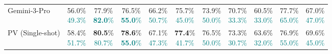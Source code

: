 \begin{table}[t]
{\begin{tabular}{@{}lcccccccccc@{}}
    \midrule
    Gemini-3-Pro & \shortstack{56.0\% \\ \textcolor{teal}{\scriptsize 49.3\%}} & \shortstack{77.9\% \\ \textcolor{teal}{\scriptsize \textbf{82.0}\%}} & \shortstack{76.5\% \\ \textcolor{teal}{\scriptsize \textbf{55.0}\%}} & \shortstack{66.2\% \\ \textcolor{teal}{\scriptsize 50.7\%}} & \shortstack{75.7\% \\ \textcolor{teal}{\scriptsize 45.0\%}} & \shortstack{73.9\% \\ \textcolor{teal}{\scriptsize 50.0\%}} & \shortstack{70.7\% \\ \textcolor{teal}{\scriptsize 33.3\%}} & \shortstack{60.5\% \\ \textcolor{teal}{\scriptsize 33.0\%}} & \shortstack{77.7\% \\ \textcolor{teal}{\scriptsize 65.0\%}} & \shortstack{67.0\% \\ \textcolor{teal}{\scriptsize 47.0\%}} \\
    PV (Single-shot) & \shortstack{58.4\% \\ \textcolor{teal}{\scriptsize 51.7\%}} & \shortstack{\textbf{80.5}\% \\ \textcolor{teal}{\scriptsize 80.7\%}} & \shortstack{\textbf{78.6}\% \\ \textcolor{teal}{\scriptsize \textbf{55.0}\%}} & \shortstack{67.1\% \\ \textcolor{teal}{\scriptsize 47.3\%}} & \shortstack{\textbf{77.4}\% \\ \textcolor{teal}{\scriptsize 41.7\%}} & \shortstack{76.5\% \\ \textcolor{teal}{\scriptsize 50.0\%}} & \shortstack{73.3\% \\ \textcolor{teal}{\scriptsize 30.7\%}} & \shortstack{63.6\% \\ \textcolor{teal}{\scriptsize 32.0\%}} & \shortstack{76.9\% \\ \textcolor{teal}{\scriptsize 55.0\%}} & \shortstack{69.6\% \\ \textcolor{teal}{\scriptsize 45.0\%}} \\

\end{tabular}}
\end{table}
